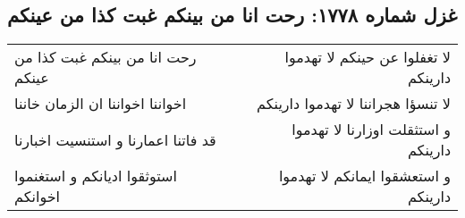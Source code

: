 \begin{center}
\section*{غزل شماره ۱۷۷۸: رحت انا من بینکم غبت کذا من عینکم}
\label{sec:1778}
\begin{longtable}{l p{0.5cm} r}
رحت انا من بینکم غبت کذا من عینکم
&&
لا تغفلوا عن حینکم لا تهدموا دارینکم
\\
اخواننا اخواننا ان الزمان خاننا
&&
لا تنسؤا هجراننا لا تهدموا دارینکم
\\
قد فاتنا اعمارنا و استنسیت اخبارنا
&&
و استثقلت اوزارنا لا تهدموا دارینکم
\\
استوثقوا ادیانکم و استغنموا اخوانکم
&&
و استعشقوا ایمانکم لا تهدموا دارینکم
\\
\end{longtable}
\end{center}
